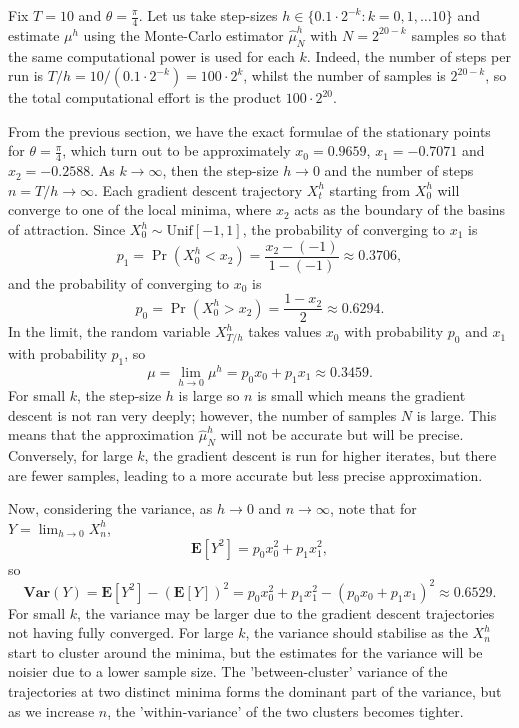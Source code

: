 \documentclass{article}
\begin{document}
Fix \(T = 10\) and \(\theta = \frac{\pi}{4}\). Let us take step-sizes \(h \in \{0.1 \cdot 2^{-k} : k = 0, 1, \dots 10\}\) and estimate \(\mu^h\) using the Monte-Carlo estimator \(\hat{\mu}^h_N\) with \(N = 2^{20-k}\) samples so that the same computational power is used for each \(k\). Indeed, the number of steps per run is \(T / h = 10 / (0.1 \cdot 2^{-k}) = 100 \cdot 2^k\), whilst the number of samples is \(2^{20-k}\), so the total computational effort is the product \(100 \cdot 2^{20}\).

From the previous section, we have the exact formulae of the stationary points for \(\theta = \frac{\pi}{4}\), which turn out to be approximately \(x_0 = 0.9659\), \(x_1 = -0.7071\) and \(x_2 = -0.2588\). As \(k \to \infty\), then the step-size \(h \to 0\) and the number of steps \(n = T / h \to \infty\). Each gradient descent trajectory \(X^h_t\) starting from \(X^h_0\) will converge to one of the local minima, where \(x_2\) acts as the boundary of the basins of attraction. Since \(X^h_0 \sim \mathrm{Unif}[-1, 1]\), the probability of converging to \(x_1\) is 
\[ p_1 = \Pr(X^h_0 < x_2) = \frac{x_2 - (-1)}{1 - (-1)} \approx 0.3706, \]
and the probability of converging to \(x_0\) is 
\[ p_0 = \Pr(X^h_0 > x_2) = \frac{1 - x_2}{2} \approx 0.6294. \]
In the limit, the random variable \(X^h_{T/h}\) takes values \(x_0\) with probability \(p_0\) and \(x_1\) with probability \(p_1\), so
\[ \mu = \lim_{h \to 0} \mu^h = p_0x_0 + p_1x_1 \approx 0.3459. \]
For small \(k\), the step-size \(h\) is large so \(n\) is small which means the gradient descent is not ran very deeply; however, the number of samples \(N\) is large. This means that the approximation \(\hat\mu^{h}_N\) will not be accurate but will be precise. Conversely, for large \(k\), the gradient descent is run for higher iterates, but there are fewer samples, leading to a more accurate but less precise approximation.

Now, considering the variance, as \(h \to 0\) and \(n \to \infty\), note that for \(Y = \lim_{h \to 0} X^h_n\),
\[ \mathbf{E}[Y^2] = p_0x_0^2 + p_1x_1^2, \]
so
\[ \mathbf{Var}(Y) = \mathbf{E}[Y^2] - (\mathbf{E}[Y])^2 = p_0x_0^2 + p_1x_1^2 - (p_0x_0 + p_1x_1)^2 \approx 0.6529. \]
For small \(k\), the variance may be larger due to the gradient descent trajectories not having fully converged. For large \(k\), the variance should stabilise as the \(X^h_n\) start to cluster around the minima, but the estimates for the variance will be noisier due to a lower sample size. The 'between-cluster' variance of the trajectories at two distinct minima forms the dominant part of the variance, but as we increase \(n\), the 'within-variance' of the two clusters becomes tighter.
\end{document}
